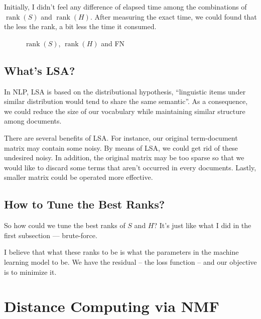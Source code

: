 \documentclass[12pt, a4paper]{article}
\begin{document}
Initially, I didn't feel any difference of elapsed time among the combinations of $\operatorname{rank}(S)$ and $\operatorname{rank}(H)$. After measuring the exact time, we could found that the less the rank, a bit less the time it consumed.

\begin{figure}[htbp]
\centering
{}
\caption{$\operatorname{rank}(S)$, $\operatorname{rank}(H)$ and FN}
\label{fig:q5.1}
\end{figure}

\subsection{What's LSA?}

In NLP, LSA is based on the distributional hypothesis, ``linguistic items under similar distribution would tend to share the same semantic''. As a consequence, we could reduce the size of our vocabulary while maintaining similar structure among documents.

There are several benefits of LSA. For instance, our original term-document matrix may contain some noisy. By means of LSA, we could get rid of these undesired noisy. In addition, the original matrix may be too sparse so that we would like to discard some terms that aren't occurred in every documents. Lastly, smaller matrix could be operated more effective.

\subsection{How to Tune the Best Ranks?}

So how could we tune the best ranks of $S$ and $H$? It's just like what I did in the first subsection --- brute-force.

I believe that what these ranks to be is what the parameters in the machine learning model to be. We have the residual -- the loss function -- and our objective is to minimize it.

\section{Distance Computing via NMF}
\end{document}
